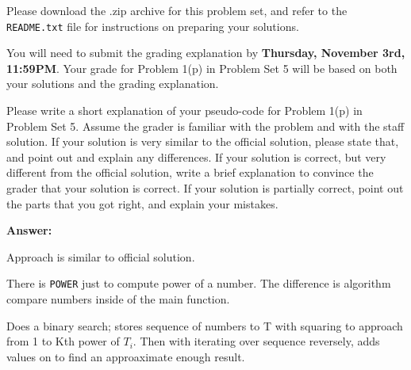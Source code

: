 \documentclass[12pt,twoside]{article}
\newcommand{\theproblemsetnum}{5E}
\newcommand{\releasedate}{November 1, 2011}
\begin{document}
\handout{Problem Set \theproblemsetnum}{\releasedate}
Please download the .zip archive for this problem set, and refer to the
\texttt{README.txt} file for instructions on preparing your solutions.

You will need to submit the grading explanation by \textbf{Thursday, November
3rd, 11:59PM}. Your grade for Problem 1(p) in Problem Set 5 will be based on
both your solutions and the grading explanation.
\medskip

\hrulefill

\begin{problems}

\problem Please write a short explanation of your pseudo-code for Problem 1(p)
in Problem Set 5. Assume the grader is familiar with the problem and with the
staff solution. If your solution is very similar to the official solution,
please state that, and point out and explain any differences. If your solution
is correct, but very different from the official solution, write a brief
explanation to convince the grader that your solution is correct. If your
solution is partially correct, point out the parts that you got right, and
explain your mistakes.

\textbf{Answer:}

Approach is similar to official solution.

There is \texttt{POWER} just to compute power of a number. The difference is
algorithm compare numbers inside of the main function.

Does a binary search; stores sequence of numbers to T with squaring to approach 
from 1 to Kth power of $T_i$. Then with iterating over sequence reversely, adds
values on to find an approaximate enough result.

\end{problems}
\end{document}
